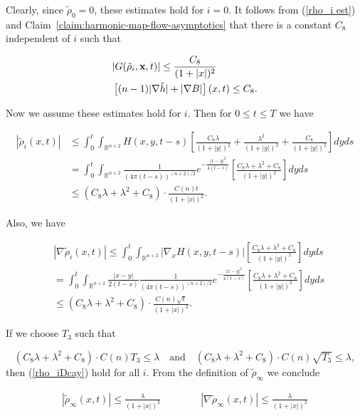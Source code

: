 Clearly, since $\tilde \rho_0=0$, these estimates hold for $i=0$. It
follows from (\ref{rho_i est}) and Claim~\ref{claim:harmonic-map-flow-asymptotics} that there is
a constant $C_8$ independent of $i$ such that

\begin{align*}
& | G(\tilde{\rho}_i,{\bf x},t) | \leq \frac{C_8}{(1+|x|)^2} \\
& \left[ (n-1) |\nabla \tilde{h}|+ |\nabla B| \right](x,t) \leq C_8.
\end{align*}



Now we assume these estimates hold for $i$. Then for $0 \leq t \leq
T$ we have

\begin{align*}
| \tilde{\rho}_i (x,t) | & \leq  \int_0^t \int_{\mathbb{R}^{n+2}}
H(x,y,t-s) \left[ \frac{C_8 \lambda }{(1+|y|)^2} + \frac{\lambda^2
}{(1+|y|)^2}
+\frac{C_8}{(1+|y|)^2} \right ] dyds \\
& = \int_0^t \int_{\mathbb{R}^{n+2}}
\frac{1}{(4\pi(t-s))^{(n+2)/2}}e^{ -\frac{|x-y|^2}{4(t-s)}} \left[
\frac{C_8 \lambda +\lambda^2+C_8}{(1+|y|)^2}  \right ] dyds \\
& \leq (C_8 \lambda +\lambda^2+C_8) \cdot \frac{C(n)t}{(1+|x|)^2}.
\end{align*}

Also, we have

\begin{align*}
& |\nabla \tilde{\rho}_i (x,t) | \leq  \int_0^t
\int_{\mathbb{R}^{n+2}} |\nabla_x H(x,y,t-s)| \left[
\frac{C_8 \lambda + \lambda^2 + C_8}{(1+|y|)^2} \right ]  dyds \\
& = \int_0^t \int_{\mathbb{R}^{n+2}}
\frac{|x-y|}{2(t-s)}\frac{1}{(4\pi(t-s))^{(n+2)/2}}e^{-\frac{|x-y|^2}{4(t-s)}}
\left[
\frac{C_8 \lambda +\lambda^2+C_8}{(1+|y|)^2}  \right ] dyds \\
& \leq (C_8 \lambda +\lambda^2+C_8) \cdot
\frac{C(n)\sqrt{t}}{(1+|x|)^2}.
\end{align*}

If we choose $T_3$ such that

\[
(C_8 \lambda +\lambda^2+C_8) \cdot C(n)T_3 \leq \lambda \quad
\text{and} \quad (C_8 \lambda +\lambda^2+C_8) \cdot C(n) \sqrt{T_3}
\leq \lambda,
\]
then (\ref{rho_iDcay}) hold for all $i$. From the definition of
$\tilde{ \rho}_\infty$ we conclude

\begin{align}
| \tilde{\rho}_\infty (x,t) | \leq  \frac{\lambda }{(1+|x|)^2}
\qquad \qquad |\nabla \tilde{\rho}_\infty (x,t) | \leq
\frac{\lambda}{(1+|x|)^2} \label{rhodecay}
\end{align}


